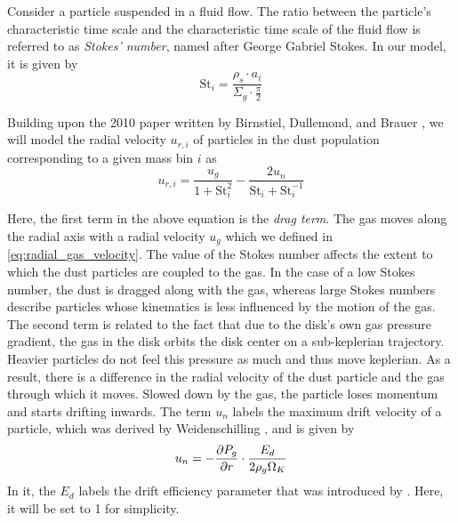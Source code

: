         Consider a particle suspended in a fluid flow. The ratio between the particle's 
        characteristic time scale and the characteristic time scale of the fluid flow
        is referred to as \textit{Stokes' number}, named after George Gabriel Stokes. 
        In our model, it is given by
        \begin{equation}
            \text{St}_i=\frac{\rho_s\cdot a_i}{\Sigma_g\cdot\frac{\pi}{2}}
        \end{equation}

        Building upon the 2010 paper written by Birnstiel, Dullemond, and Brauer 
        \cite{birnstiel_dullemond_brauer_2010}, we will model the
        radial velocity $u_{r,i}$ of particles in the dust population corresponding to 
        a given mass bin $i$ as
        \begin{equation}
            \label{eq:radial_dust_velocity}
            u_{r,i}
            =\frac{u_{g}}{1+\text{St}_i^2}-\frac{2u_{n}}{\text{St}_i+\text{St}_i^{-1}}
        \end{equation}

        Here, the first term in the above equation is the \textit{drag term}. 
        The gas moves along 
        the radial axis with a radial velocity $u_g$
        which we defined in \cref{eq:radial_gas_velocity}.
        The value of the Stokes number affects 
        the extent to which the dust particles are coupled to the gas. In the case of a low 
        Stokes number, the dust is dragged along with the gas, whereas large Stokes numbers 
        describe particles whose kinematics is less influenced by the motion of the gas. \\

        The second term is related to the fact that due to the disk's own gas pressure 
        gradient, the gas in the disk orbits the disk center on a sub-keplerian 
        trajectory. Heavier particles do not feel this pressure as much and 
        thus move keplerian. As a result, there is a difference in the radial velocity
        of the dust particle and the gas through which it moves. Slowed down by the gas, 
        the particle loses momentum and starts drifting inwards. 
        The term $u_n$ labels the maximum drift velocity of a particle, which was derived 
        by Weidenschilling \cite{weidenschilling_1977}, and is given by
        \begin{equation}
            u_{n}
            =-\frac{\partial P_g}{\partial r}\cdot\frac{E_d}{2\rho_g\Omega_K}
        \end{equation}
        In it, the $E_d$ labels the drift efficiency parameter that was introduced by 
        \cite{birnstiel_dullemond_brauer_2010}. Here, it will be set to 1 for simplicity. \\

